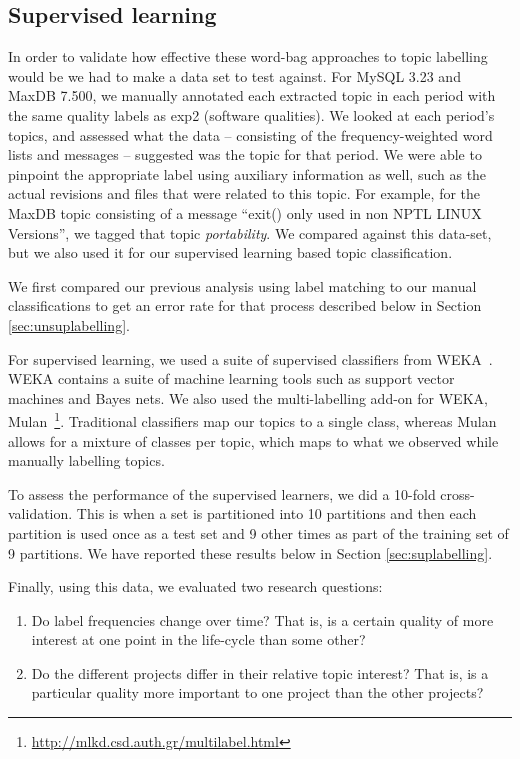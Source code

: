 \documentclass{acm_proc_article-sp}
\begin{document}
\subsection{Supervised learning}

\label{sec:suplearn}

In order to validate how effective these word-bag approaches to topic labelling would be we had to make a data set to test against.  For MySQL 3.23 and MaxDB 7.500, we manually annotated each extracted topic in each period with the same quality labels as \textsf{exp2} (software qualities). We looked at each period's topics, and assessed what the data -- consisting of the frequency-weighted word lists and messages -- suggested was the topic for that period. We were able to pinpoint the appropriate label using auxiliary information as well, such as the actual revisions and files that were related to this topic. For example, for the MaxDB topic consisting of a message ``exit() only used in non NPTL LINUX Versions'', we tagged that topic \emph{portability}. We compared against this data-set, but we also used it for our supervised learning based topic classification.

We first compared our previous analysis using label matching to our manual classifications to get an error rate for that process described below in Section \ref{sec:unsuplabelling}. 

For supervised learning, we used a suite of supervised classifiers from WEKA~\cite{weka09}. WEKA contains a suite of machine learning tools such as support vector machines and Bayes nets. We also used the multi-labelling add-on for WEKA, Mulan~\cite{mulan}\footnote{\url{http://mlkd.csd.auth.gr/multilabel.html}}. Traditional classifiers map our topics to a single class, whereas Mulan allows for a mixture of classes per topic, which maps to what we observed while manually labelling topics.

To assess the performance of the supervised learners, we did a 10-fold cross-validation. This is when a set is partitioned into 10 partitions and then each partition is used once as a test set and 9 other times as part of the training set of 9 partitions. We have reported these results below in Section \ref{sec:suplabelling}.

Finally, using this data, we evaluated two research questions:
\begin{enumerate}
\item Do label frequencies change over time? That is, is a certain quality of more interest at one point in the life-cycle than some other? 
\item  Do the different projects differ in their relative topic interest? That is, is a particular quality more important to one project than the other projects?  
\end{enumerate}
\end{document}
